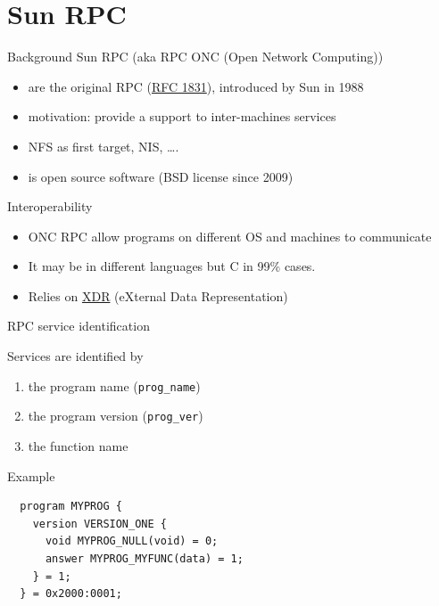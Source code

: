 \documentclass[bigger,hyperref={colorlinks=true, urlcolor=red, plainpages=false, pdfpagelabels, bookmarksnumbered}]{beamer}
\begin{document}
\section{Sun RPC}
\label{sec-2}
\begin{frame}[label=sec-2-1]{Background}
Sun RPC  (aka RPC ONC (Open Network Computing)) 
\begin{itemize}
\item are the original RPC (\href{http://tools.ietf.org/html/rfc1831}{RFC 1831}), introduced by Sun in 1988
\item motivation: provide a support to inter-machines services
\item NFS as first target, NIS, \ldots{}.
\item is open source software (BSD license since 2009)
\end{itemize}
\end{frame}
\begin{frame}[label=sec-2-2]{Interoperability}
\begin{itemize}
\item ONC RPC allow programs on different OS and machines to communicate
\item It may be in different languages but C in 99\% cases.
\item Relies on \href{http://www.ietf.org/rfc/rfc4506.txt}{XDR} (eXternal Data Representation)
\end{itemize}
\end{frame}

\begin{frame}[fragile,label=sec-2-3]{RPC service identification}
 \begin{block}{Services are identified by}
\begin{enumerate}
\item the program name (\verb~prog_name~)
\item the program version (\verb~prog_ver~)
\item the function name
\end{enumerate}
\end{block}
\begin{beamercolorbox}{Example}
\lstset{language=C,label= ,caption= ,numbers=none}
\begin{lstlisting}
  program MYPROG {
    version VERSION_ONE {
      void MYPROG_NULL(void) = 0;
      answer MYPROG_MYFUNC(data) = 1;
    } = 1;
  } = 0x2000:0001;
\end{lstlisting}
\end{beamercolorbox}
\end{frame}
\end{document}
